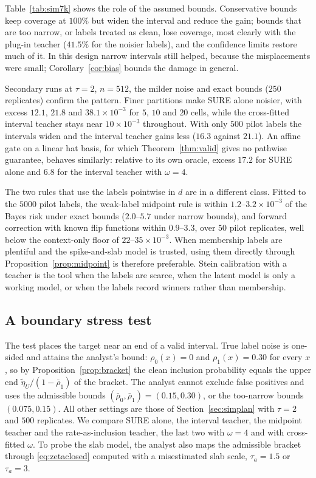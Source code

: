 \documentclass[11pt]{article}
\theoremstyle{plain}
\theoremstyle{definition}
\theoremstyle{remark}
\begin{document}
Table~\ref{tab:sim7k} shows the role of the assumed bounds. Conservative bounds keep coverage
at $100\%$ but widen the interval and reduce the gain; bounds that are too narrow, or labels
treated as clean, lose coverage, most clearly with the plug-in teacher ($41.5\%$ for the noisier
labels), and the confidence limits restore much of it. In this design narrow intervals still
helped, because the misplacements were small; Corollary~\ref{cor:bias} bounds the damage in
general.

Secondary runs at $\tau=2$, $n=512$, the milder noise and exact bounds ($250$ replicates)
confirm the pattern. Finer partitions make SURE alone noisier, with excess $12.1$, $21.8$ and
$38.1\times10^{-3}$ for $5$, $10$ and $20$ cells, while the cross-fitted interval teacher stays near
$10\times10^{-3}$ throughout. With only $500$ pilot labels the intervals widen and the interval
teacher gains less ($16.3$ against $21.1$). An affine gate on a linear hat basis, for which
Theorem~\ref{thm:valid} gives no pathwise guarantee, behaves similarly: relative to its own
oracle, excess $17.2$ for SURE alone and $6.8$ for the interval teacher with $\omega=4$.

The two rules that use the labels pointwise in $d$ are in a different class. Fitted to the
$5000$ pilot labels, the weak-label midpoint rule is within $1.2$--$3.2\times10^{-3}$ of the Bayes
risk under exact bounds ($2.0$--$5.7$ under narrow bounds), and forward correction with known
flip functions within $0.9$--$3.3$, over $50$ pilot replicates, well below the context-only floor
of $22$--$35\times10^{-3}$. When membership labels are plentiful and the spike-and-slab model is
trusted, using them directly through Proposition~\ref{prop:midpoint} is therefore preferable.
Stein calibration with a teacher is the tool when the labels are scarce, when the latent model
is only a working model, or when the labels record winners rather than membership.


\subsection{A boundary stress test}\label{sec:stress}

The test places the target near an end of a valid interval. True label noise is one-sided and
attains the analyst's bound: $\rho_0(x)=0$ and $\rho_1(x)=0.30$ for every $x$, so by
Proposition~\ref{prop:bracket} the clean inclusion probability equals the upper end
$\widetilde\eta_U/(1-\bar\rho_1)$ of the bracket. The analyst cannot exclude false positives and
uses the admissible bounds $(\bar\rho_0,\bar\rho_1)=(0.15,0.30)$, or the too-narrow bounds
$(0.075,0.15)$. All other settings are those of Section~\ref{sec:simplan} with $\tau=2$ and $500$
replicates. We compare SURE alone, the interval teacher, the midpoint teacher and the
rate-as-inclusion teacher, the last two with $\omega=4$ and with cross-fitted $\omega$. To probe
the slab model, the analyst also maps the admissible bracket through \eqref{eq:zetaclosed}
computed with a misestimated slab scale, $\tau_a=1.5$ or $\tau_a=3$.
\end{document}
